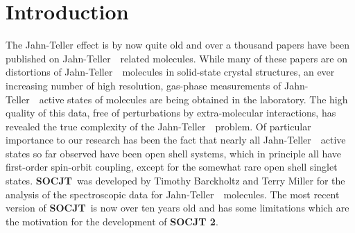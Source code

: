 \documentclass{article}
\newcommand{\JT}{Jahn-Teller\ }
\newcommand{\socjttwo}{{\bf SOCJT 2}}
\newcommand{\socjt}{{\bf SOCJT}}
\newcommand{\socrt}{{\bf SOCRT}}
\newcommand{\etoe}{{\bf e2e}}
\begin{document}
\begin{comment}
The following files are included in the distribution file {\tt
  socjt.zip}: 
\begin{description}
\item[{\tt socjt.exe}] Executable file for the main program,
  \socjt, to be run from a MS-DOS prompt.
\item[{\tt socrt.exe}] Executable file for the Renner-Teller
  version, \socrt .
\item[{\tt e2e.exe}] Executable file for the calculation of
  electronic transition intensities from one \JT\ active state to
  another.
\item[{\tt pi2pi.exe}] Executable file for the calculation of
  electronic transition intensities from one Renner-Teller active
  state to another. This file is not yet available.
\item[{\tt inputasst.exe}] Executable file that creates an input
  file for {\tt socjt.exe } based on the answers to a series of
  questions.
\item[{\tt test1}] Plain text input file to test \socjt.
\item[{\tt test2}] Plain text input file to test \socjt. The output
  of the files {\tt test1} and {\tt test2} can be used as input for
  \etoe .
\item[{\tt rt\_test}] Plain text input file to test \socrt .
\item[{\tt e2e\_test}] Plain text input file to test \etoe .
\item[{\tt manual.tex, manual.ps, and manual.pdf}] The users guide for
  the suite of programs. 
\item[{\tt output.zip}] All of the output files that are generated by
  running the test files. 
\end{description}
\end{comment}

\newpage

\section{Introduction} \label{section:intro}

The Jahn-Teller effect is by now quite old and over a thousand papers
have been published on \JT\ related molecules.  While many of these
papers are on distortions of \JT\ molecules in solid-state crystal
structures, an ever increasing number of high resolution, gas-phase
measurements of \JT\ active states of molecules are being obtained in
the laboratory. The high quality of this data, free of perturbations
by extra-molecular interactions, has revealed the true complexity of
the \JT\ problem. Of particular importance to our research has been
the fact that nearly all \JT\ active states so far observed have been
open shell systems, which in principle all have first-order
spin-orbit coupling, except for the somewhat rare open shell singlet
states. \socjt\ was developed by Timothy Barckholtz and Terry Miller for the analysis of the spectroscopic data for \JT\ molecules. The most recent version of \socjt\ is now over ten years old and has some limitations which are the motivation for the development of \socjttwo.
\end{document}

